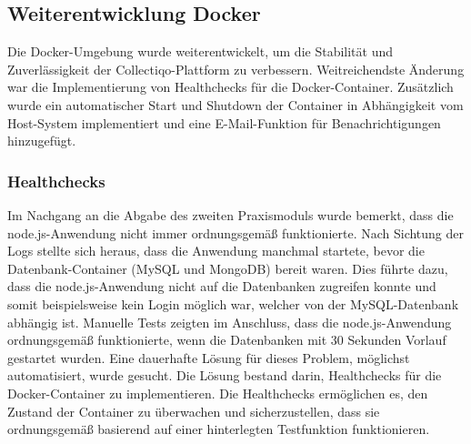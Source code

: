 \subsection{Weiterentwicklung Docker}\label{subsubsec:vserver-docker}

Die Docker-Umgebung wurde weiterentwickelt, um die Stabilität und Zuverlässigkeit der Collectiqo-Plattform zu verbessern.
Weitreichendste Änderung war die Implementierung von Healthchecks für die Docker-Container.
Zusätzlich wurde ein automatischer Start und Shutdown der Container in Abhängigkeit vom Host-System implementiert und eine E-Mail-Funktion für Benachrichtigungen hinzugefügt.

\subsubsection{Healthchecks}\label{subsubsec:vserver-docker-healthchecks}

Im Nachgang an die Abgabe des zweiten Praxismoduls wurde bemerkt, dass die node.js-Anwendung nicht immer ordnungsgemäß funktionierte.
Nach Sichtung der Logs stellte sich heraus, dass die Anwendung manchmal startete, bevor die Datenbank-Container (MySQL und MongoDB) bereit waren.
Dies führte dazu, dass die node.js-Anwendung nicht auf die Datenbanken zugreifen konnte und somit beispielsweise kein Login möglich war, welcher von der MySQL-Datenbank abhängig ist.
Manuelle Tests zeigten im Anschluss, dass die node.js-Anwendung ordnungsgemäß funktionierte, wenn die Datenbanken mit 30 Sekunden Vorlauf gestartet wurden.
Eine dauerhafte Lösung für dieses Problem, möglichst automatisiert, wurde gesucht.
Die Lösung bestand darin, Healthchecks für die Docker-Container zu implementieren.
Die Healthchecks ermöglichen es, den Zustand der Container zu überwachen und sicherzustellen, dass sie ordnungsgemäß basierend auf einer hinterlegten Testfunktion funktionieren.

